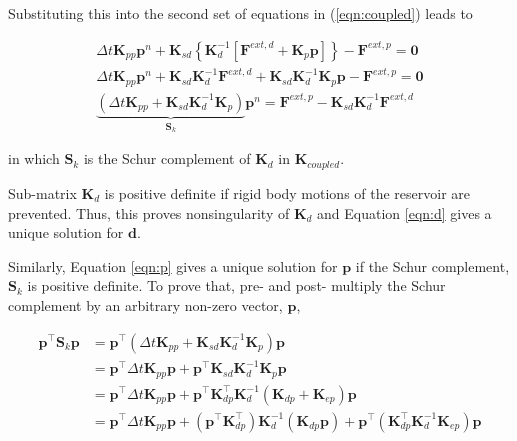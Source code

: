 \documentclass{article}
\begin{document}
Substituting this into the second set of equations in (\ref{eqn:coupled}) leads to

\begin{equation}
\begin{gathered}
	\Delta t\mathbf{K}_{pp} \mathbf{p}^n
	+ \mathbf{K}_{sd}\left \lbrace \mathbf{K}_{d}^{-1}
	\left[
	\mathbf{F}^{ext,d}
	+ \mathbf{K}_{p} \mathbf{p}
	\right]\right \rbrace
	- \mathbf{F}^{ext,p} = \mathbf{0}
	\\
	\Delta t \mathbf{K}_{pp} \mathbf{p}^n
	+ \mathbf{K}_{sd} \mathbf{K}_{d}^{-1}
	\mathbf{F}^{ext,d}
	+ \mathbf{K}_{sd} \mathbf{K}_{d}^{-1} \mathbf{K}_{p} \mathbf{p}
	- \mathbf{F}^{ext,p} = \mathbf{0}
	\\
	\underbrace{\left(\Delta t \mathbf{K}_{pp} + \mathbf{K}_{sd} \mathbf{K}_{d}^{-1} \mathbf{K}_{p} \right)}_{\mathbf{S}_k}
	\mathbf{p}^n
	= \mathbf{F}^{ext,p}
	- \mathbf{K}_{sd} \mathbf{K}_{d}^{-1}
	\mathbf{F}^{ext,d} 
\end{gathered}
\label{eqn:p}
\end{equation}

in which $\mathbf{S}_k$ is the Schur complement of $\mathbf{K}_{d}$ in $\mathbf{K}_{coupled}$. 

Sub-matrix $\mathbf{K}_{d}$ is positive definite if rigid body motions of the reservoir are prevented.
Thus, this proves nonsingularity of $\mathbf{K}_{d}$ and Equation \ref{eqn:d} gives a unique solution for $\mathbf{d}$. 

Similarly, Equation \ref{eqn:p} gives a unique solution for $\mathbf{p}$ if the Schur complement, $\mathbf{S}_k$ is positive definite. 
To prove that, pre- and post- multiply the Schur complement by an arbitrary non-zero vector, $\mathbf{p}$, 

\begin{equation}
\begin{aligned}
	\mathbf{p}^{\top} \mathbf{S}_k \mathbf{p} &= 
\mathbf{p}^{\top} \left(\Delta t\mathbf{K}_{pp} + \mathbf{K}_{sd} \mathbf{K}_{d}^{-1} \mathbf{K}_{p} \right) \mathbf{p}
\\
&= 
\mathbf{p}^{\top} \Delta t\mathbf{K}_{pp} \mathbf{p}
+
\mathbf{p}^{\top} \mathbf{K}_{sd} \mathbf{K}_{d}^{-1} \mathbf{K}_{p} \mathbf{p}
\\
&= 
\mathbf{p}^{\top} \Delta t\mathbf{K}_{pp} \mathbf{p}
+
\mathbf{p}^{\top} \mathbf{K}_{dp}^{\top} \mathbf{K}_{d}^{-1} \left(\mathbf{K}_{dp} + \mathbf{K}_{ep}\right) \mathbf{p}
\\
&=
\mathbf{p}^{\top} \Delta t\mathbf{K}_{pp} \mathbf{p}
+
\left(\mathbf{p}^{\top} \mathbf{K}_{dp}^{\top}\right) \mathbf{K}_{d}^{-1} \left(\mathbf{K}_{dp} \mathbf{p}\right)
+
\mathbf{p}^{\top} \left( \mathbf{K}_{dp}^{\top} \mathbf{K}_{d}^{-1} \mathbf{K}_{ep} \right) \mathbf{p}
\end{aligned}
\end{equation}
\end{document}
